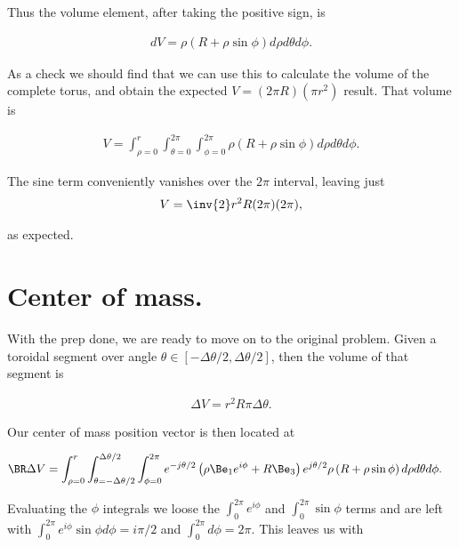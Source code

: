 Thus the volume element, after taking the positive sign, is

\begin{align}\label{eqn:torusCenterOfMass:6}
dV = \rho \left( R + \rho \sin\phi \right) d\rho d\theta d\phi.
\end{align}

As a check we should find that we can use this to calculate the volume of the complete torus, and obtain the expected $V = (2 \pi R) (\pi r^2)$ result.  That volume is

\begin{align}\label{eqn:torusCenterOfMass:7}
V = \int_{\rho=0}^r \int_{\theta=0}^{2\pi} \int_{\phi=0}^{2\pi} \rho \left( R + \rho \sin\phi \right) d\rho d\theta d\phi.
\end{align}

The sine term conveniently vanishes over the $2\pi$ interval, leaving just
\begin{align}\label{eqn:torusCenterOfMass:8}
V = \inv{2} r^2 R (2 \pi)(2 \pi),
\end{align}

as expected.

\section{Center of mass.}

With the prep done, we are ready to move on to the original problem.  Given a toroidal segment over angle $\theta \in [-\Delta \theta/2, \Delta \theta/2]$, then the volume of that segment is 

\begin{align}\label{eqn:torusCenterOfMass:9}
\Delta V = r^2 R \pi \Delta \theta.
\end{align}

Our center of mass position vector is then located at

\begin{align}\label{eqn:torusCenterOfMass:10}
\BR \Delta V 
&= 
\int_{\rho=0}^r \int_{\theta=-\Delta \theta/2}^{\Delta \theta/2} \int_{\phi=0}^{2\pi} 
e^{-j\theta/2} \left( \rho \Be_1 e^{ i \phi } + R \Be_3 \right) e^{j \theta/2} 
\rho \left( R + \rho \sin\phi \right) d\rho d\theta d\phi.
\end{align}

Evaluating the $\phi$ integrals we loose the $\int_0^{2\pi} e^{i\phi}$ and $\int_0^{2\pi} \sin\phi$ terms and are left with $\int_0^{2\pi} e^{i\phi} \sin\phi d\phi = i \pi /2$ and $\int_0^{2\pi} d\phi = 2 \pi$.  This leaves us with 

